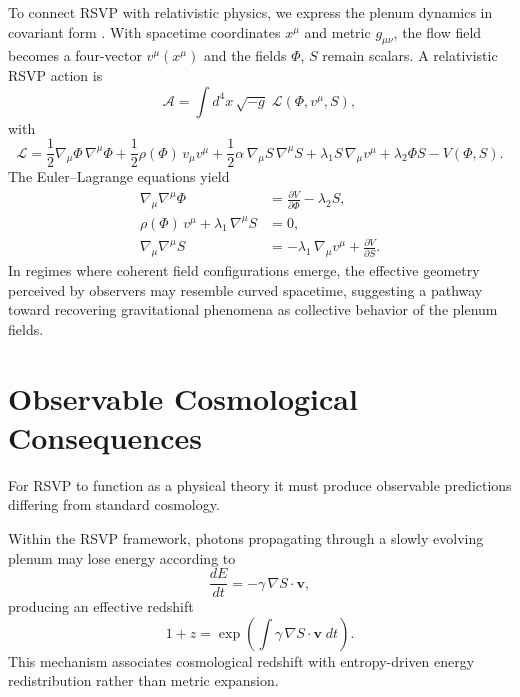 \documentclass[12pt,a4paper]{article}
\theoremstyle{plain}
\theoremstyle{definition}
\theoremstyle{remark}
\begin{document}
To connect RSVP with relativistic physics, we express the plenum
dynamics in covariant form \cite{MisnerThorneWheeler,Wald}. With
spacetime coordinates $x^\mu$ and metric $g_{\mu\nu}$, the flow field
becomes a four-vector $v^\mu(x^\mu)$ and the fields $\Phi$, $S$
remain scalars. A relativistic RSVP action is
\begin{equation}
\mathcal{A} = \int d^4x\,\sqrt{-g}\;
\mathcal{L}(\Phi, v^\mu, S),
\end{equation}
with
\begin{equation}
\mathcal{L} =
\frac{1}{2}\nabla_\mu\Phi\,\nabla^\mu\Phi
+ \frac{1}{2}\rho(\Phi)\,v_\mu v^\mu
+ \frac{1}{2}\alpha\,\nabla_\mu S\,\nabla^\mu S
+ \lambda_1 S\,\nabla_\mu v^\mu
+ \lambda_2 \Phi S
- V(\Phi,S).
\end{equation}
The Euler--Lagrange equations yield
\begin{align}
\nabla_\mu \nabla^\mu \Phi &= \frac{\partial V}{\partial \Phi} - \lambda_2 S,
\label{eq:cov-phi} \\
\rho(\Phi)\,v^\mu + \lambda_1\,\nabla^\mu S &= 0,
\label{eq:cov-v} \\
\nabla_\mu \nabla^\mu S &= -\lambda_1\,\nabla_\mu v^\mu + \frac{\partial V}{\partial S}.
\label{eq:cov-S}
\end{align}
In regimes where coherent field configurations emerge, the effective
geometry perceived by observers may resemble curved spacetime,
suggesting a pathway toward recovering gravitational phenomena as
collective behavior of the plenum fields.

\section{Observable Cosmological Consequences}

For RSVP to function as a physical theory it must produce observable
predictions differing from standard cosmology.

Within the RSVP framework, photons propagating through a slowly
evolving plenum may lose energy according to
\begin{equation}
\frac{dE}{dt} = -\gamma\,\nabla S \cdot \mathbf{v},
\end{equation}
producing an effective redshift
\begin{equation}
1+z = \exp\!\left(\int \gamma\,\nabla S \cdot \mathbf{v}\;dt\right).
\end{equation}
This mechanism associates cosmological redshift with entropy-driven
energy redistribution rather than metric expansion.
\end{document}
